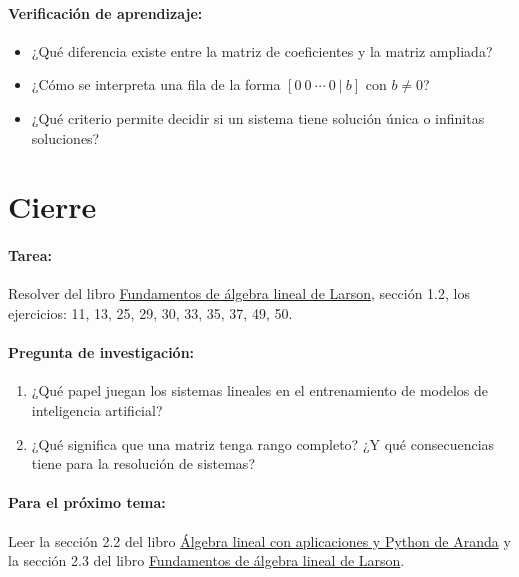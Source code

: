 \documentclass[a4,11pt]{aleph-notas}
\begin{document}
\paragraph{Verificación de aprendizaje:}
\begin{itemize}[leftmargin=*]
    \item ¿Qué diferencia existe entre la matriz de coeficientes y la matriz ampliada?
    \item ¿Cómo se interpreta una fila de la forma $[0\ 0\ \cdots\ 0\ |\ b]$ con $b\neq 0$?
    \item ¿Qué criterio permite decidir si un sistema tiene solución única o infinitas soluciones?
\end{itemize}

\section*{Cierre}

\paragraph{Tarea:}  
Resolver del libro \href{https://catalogobiblioteca.puce.edu.ec/cgi-bin/koha/opac-detail.pl?biblionumber=86081}{Fundamentos de álgebra lineal de Larson}, sección 1.2, los ejercicios: 11, 13, 25, 29, 30, 33, 35, 37, 49, 50.

\paragraph{Pregunta de investigación:}
\begin{enumerate}[leftmargin=*]
    \item ¿Qué papel juegan los sistemas lineales en el entrenamiento de modelos de inteligencia artificial?
    \item ¿Qué significa que una matriz tenga rango completo? ¿Y qué consecuencias tiene para la resolución de sistemas?
\end{enumerate}

\paragraph{Para el próximo tema:}  
Leer la sección 2.2 del libro \href{https://catalogobiblioteca.puce.edu.ec/cgi-bin/koha/opac-detail.pl?biblionumber=283260}{Álgebra lineal con aplicaciones y Python de Aranda} y la sección 2.3 del libro \href{https://catalogobiblioteca.puce.edu.ec/cgi-bin/koha/opac-detail.pl?biblionumber=86081}{Fundamentos de álgebra lineal de Larson}.
\end{document}
